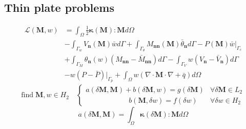\documentclass{article}
\begin{document}
\subsection{Thin plate problems}
\begin{equation}\label{plateenergy}
    \begin{split}
        \mathcal L(\boldsymbol M, w) 
        &= \int_{\Omega} \frac{1}{2} \boldsymbol \kappa(\boldsymbol M) : \boldsymbol M d\Omega \\ 
        &- \int_{\Gamma_w} V_{\boldsymbol n}(\boldsymbol M) \bar{w} d\Gamma + \int_{\Gamma_\theta} M_{\boldsymbol{nn}}(\boldsymbol M)\bar{\theta}_{\boldsymbol n} d\Gamma - P(\boldsymbol M)\bar{w}\vert_{\Gamma_c} \\
        &+ \int_{\Gamma_M} \theta_{\boldsymbol n}(w)(M_{\boldsymbol{nn}}-\bar{M}_{\boldsymbol{nn}})d\Gamma - \int_{\Gamma_V} w(V_{\boldsymbol n} - \bar{V}_{\boldsymbol n})d\Gamma \\ 
        &- w(P-\bar P)\vert_{\Gamma_p} + \int_{\Omega} w(\nabla \cdot \boldsymbol M \cdot \nabla + \bar{q})d\Omega
    \end{split}
\end{equation}
\begin{equation}
    \mathrm{find} \; \boldsymbol M, w \in H_2 \quad
    \begin{cases}
        a(\delta \boldsymbol M,\boldsymbol M) + b(\delta \boldsymbol M, w) = g(\delta \boldsymbol M) & \forall \delta \boldsymbol M \in L_2 \\
        \qquad \qquad \qquad  b(\boldsymbol M, \delta w) = f(\delta w) & \forall \delta w \in H_2
    \end{cases}
\end{equation}
\begin{equation}
    a(\delta \boldsymbol M,\boldsymbol M) = \int_{\Omega} \boldsymbol \kappa(\delta \boldsymbol M): \boldsymbol M d\Omega
\end{equation}
\end{document}
